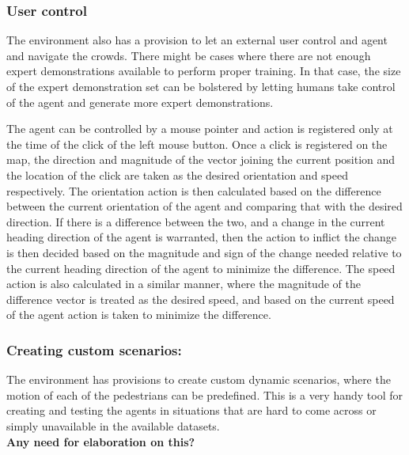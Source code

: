 \subsubsection{User control}
The environment also has a provision to let an external user control and agent and navigate the crowds. There might be cases where there are not enough expert demonstrations available to perform proper training. In that case, the size of the expert demonstration set can be bolstered by letting humans take control of the agent and generate more expert demonstrations. 

The agent can be controlled by a mouse pointer and action is registered only at the time of the click of the left mouse button. Once a click is registered on the map, the direction and magnitude of the vector joining the current position and the location of the click are taken as the desired orientation and speed respectively.  
The orientation action is then calculated based on the difference between the current orientation of the agent and comparing that with the desired direction. If there is a difference between the two, and a change in the current heading direction of the agent is warranted, then the action to inflict the change is then decided based on the magnitude and sign of the change needed relative to the current heading direction of the agent to minimize the difference.
The speed action is also calculated in a similar manner, where the magnitude of the difference vector is treated as the desired speed, and based on the current speed of the agent action is taken to minimize the difference.

\subsubsection{Creating custom scenarios:}
The environment has provisions to create custom dynamic scenarios, where the motion of each of the pedestrians can be predefined. This is a very handy tool for creating and testing the agents in situations that are hard to come across or simply unavailable in the available datasets.\\
\textbf{Any need for elaboration on this?}


